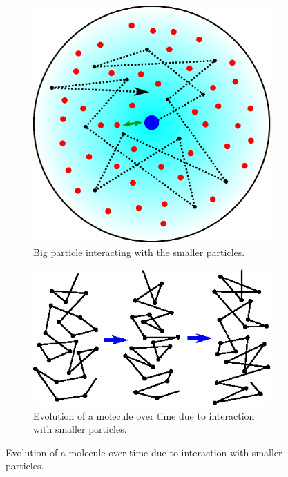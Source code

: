 \documentclass[a4paper,10pt]{beamer}
\begin{document}
\begin{frame}
		\begin{figure}[H]
			\flushleft
			\begin{subfigure}[b]{0.35\linewidth}
				\includegraphics[width=\linewidth]{./Plots/HeatBathAlt.eps}
				\caption{Big particle interacting with the smaller particles.}
				\label{fig:HeatBath}
			\end{subfigure}
			\hfill
			\begin{subfigure}[b]{0.6\linewidth}
				\includegraphics[width=\linewidth]{./Plots/ParticleEvolution.eps}
				\caption{Evolution of a molecule over time due to interaction with smaller particles.}
				\label{fig:ParticleEvolution}
			\end{subfigure}
		\end{figure}
		
	\end{frame}		
	
\end{document}

